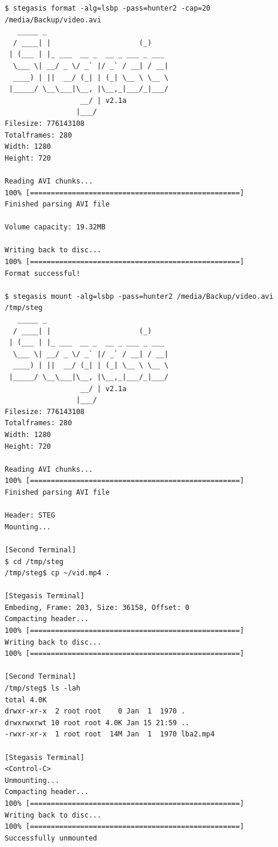 \documentclass[paper=a4, fontsize=11pt,twoside]{scrartcl}
\numberwithin{table}{section}
\numberwithin{figure}{section}
\numberwithin{algorithm}{section}
\begin{document}
\begin{lstlisting}[caption={\texttt{Stegasis} example use.},frame=single, upquote=true,label=usecase,showstringspaces=false]
$ stegasis format -alg=lsbp -pass=hunter2 -cap=20 /media/Backup/video.avi 
   _____ _                                  
  / ____| |                     (_)         
 | (___ | |_ ___  __ _  __ _ ___ _ ___      
  \___ \| __/ _ \/ _` |/ _` / __| / __|  
  ____) | ||  __/ (_| | (_| \__ \ \__ \ 
 |_____/ \__\___|\__, |\__,_|___/_|___/ 
                  __/ | v2.1a               
                 |___/                      
Filesize: 776143108
Totalframes: 280
Width: 1280
Height: 720

Reading AVI chunks...
100% [==================================================]
Finished parsing AVI file

Volume capacity: 19.32MB

Writing back to disc...
100% [==================================================]
Format successful!

$ stegasis mount -alg=lsbp -pass=hunter2 /media/Backup/video.avi /tmp/steg
   _____ _                                  
  / ____| |                     (_)         
 | (___ | |_ ___  __ _  __ _ ___ _ ___      
  \___ \| __/ _ \/ _` |/ _` / __| / __|  
  ____) | ||  __/ (_| | (_| \__ \ \__ \ 
 |_____/ \__\___|\__, |\__,_|___/_|___/ 
                  __/ | v2.1a               
                 |___/                      
Filesize: 776143108
Totalframes: 280
Width: 1280
Height: 720

Reading AVI chunks...
100% [==================================================]
Finished parsing AVI file

Header: STEG
Mounting...

[Second Terminal]
$ cd /tmp/steg
/tmp/steg$ cp ~/vid.mp4 .

[Stegasis Terminal]
Embeding, Frame: 203, Size: 36158, Offset: 0
Compacting header...
100% [==================================================]
Writing back to disc...
100% [==================================================]

[Second Terminal]
/tmp/steg$ ls -lah
total 4.0K
drwxr-xr-x  2 root root    0 Jan  1  1970 .
drwxrwxrwt 10 root root 4.0K Jan 15 21:59 ..
-rwxr-xr-x  1 root root  14M Jan  1  1970 lba2.mp4

[Stegasis Terminal]
<Control-C>
Unmounting...
Compacting header...
100% [==================================================]
Writing back to disc...
100% [==================================================]
Successfully unmounted
\end{lstlisting}
\end{document}
